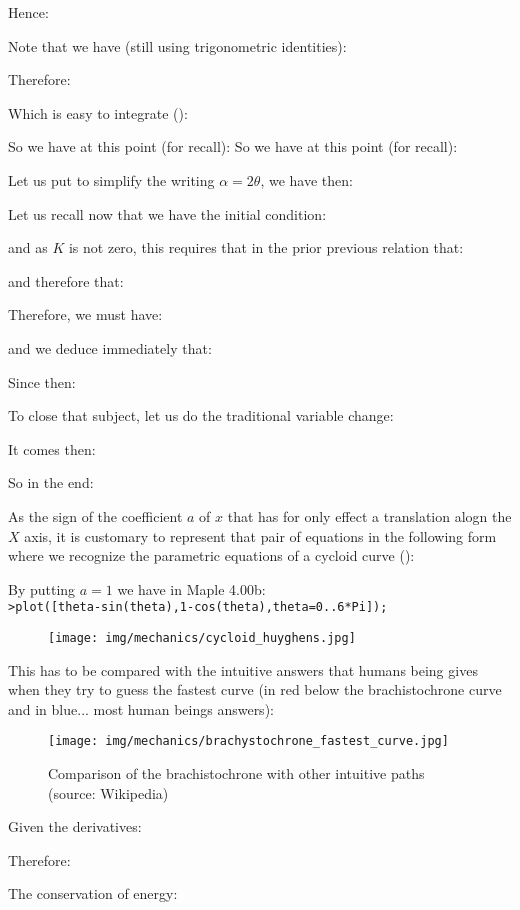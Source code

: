 	Hence:
	
	Note that we have (still using trigonometric identities):
	
	Therefore:
	
	Which is easy to integrate ():
	
	So we have at this point (for recall):
	So we have at this point (for recall):
	
	Let us put to simplify the writing $\alpha=2\theta$, we have then:
	
	Let us recall now that we have the initial condition:
	
	and as $K$ is not zero, this requires that in the prior previous relation that:
	
	and therefore that:
	
	Therefore, we must have:
	
	and we deduce immediately that:
	
	Since then:
	
	To close that subject, let us do the traditional variable change:
	
	It comes then:
	
	So in the end:
	
	As the sign of the coefficient $a$ of $x$ that has for only effect a translation alogn the $X$ axis, it is customary to represent that pair of equations in the following form where we recognize the parametric equations of a cycloid curve ():
	
	By putting $a=1$ we have in Maple 4.00b:\\
	
	 \texttt{>plot([theta-sin(theta),1-cos(theta),theta=0..6*Pi]);}
	 \begin{figure}[H]
		\centering
		\texttt{[image: img/mechanics/cycloid\_huyghens.jpg]}
	\end{figure}
	This has to be compared with the intuitive answers that humans being gives when they try to guess the fastest curve (in red below the brachistochrone curve and in blue... most human beings answers):
	\begin{figure}[H]
		\centering
		\texttt{[image: img/mechanics/brachystochrone\_fastest\_curve.jpg]}
		\caption{Comparison of the brachistochrone with other intuitive paths (source: Wikipedia)}
	\end{figure}
	Given the derivatives:
	
	Therefore:
	
	The conservation of energy:
	
